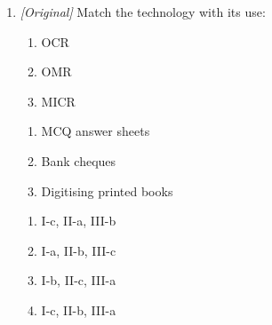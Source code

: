\begin{enumerate}[label=\textbf{Q\arabic*.}, leftmargin=*]
\begin{enumerate}[label=\Alph*.]
    \item It is used for objective answer sheets.
    \item It recognises the characters printed in magnetic ink.
    \item It detects whether a position has been marked.
  \end{enumerate}
\item \textit{[Original]} Match the technology with its use:
  \begin{enumerate}[label=\Roman*.]
    \item OCR
    \item OMR
    \item MICR
  \end{enumerate}
  \begin{enumerate}[label=(\alph*)]
    \item MCQ answer sheets
    \item Bank cheques
    \item Digitising printed books
  \end{enumerate}
  \begin{enumerate}[label=\Alph*.]
    \item I-c, II-a, III-b
    \item I-a, II-b, III-c
    \item I-b, II-c, III-a
    \item I-c, II-b, III-a
  \end{enumerate}


\end{enumerate}
